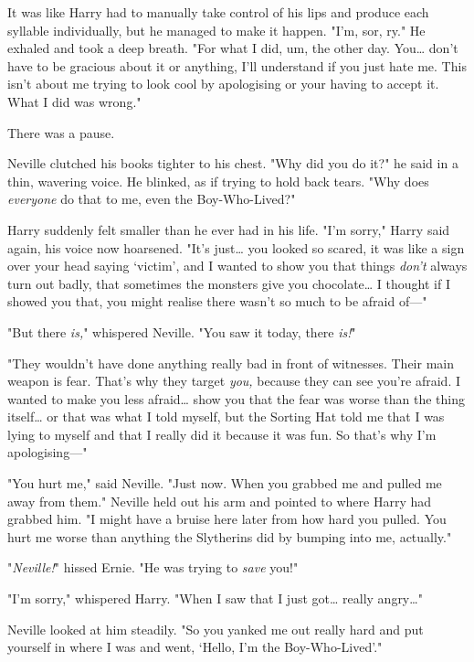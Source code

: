 It was like Harry had to manually take control of his lips and produce each
syllable individually, but he managed to make it happen. "I'm, sor, ry." He
exhaled and took a deep breath. "For what I did, um, the other day. You{\ldots}
don't have to be gracious about it or anything, I'll understand if you just
hate me. This isn't about me trying to look cool by apologising or your having
to accept it. What I did was wrong."

There was a pause.

Neville clutched his books tighter to his chest. "Why did you do it?" he said
in a thin, wavering voice. He blinked, as if trying to hold back tears. "Why
does \emph{everyone} do that to me, even the Boy-Who-Lived?"

Harry suddenly felt smaller than he ever had in his life. "I'm sorry," Harry
said again, his voice now hoarsened. "It's just{\ldots} you looked so scared,
it was like a sign over your head saying `victim', and I wanted to show you
that things \emph{don't} always turn out badly, that sometimes the monsters
give you chocolate{\ldots} I thought if I showed you that, you might realise
there wasn't so much to be afraid of---"

"But there \emph{is,}" whispered Neville. "You saw it today, there \emph{is!}"

"They wouldn't have done anything really bad in front of witnesses. Their main
weapon is fear. That's why they target \emph{you,} because they can see you're
afraid. I wanted to make you less afraid{\ldots} show you that the fear was
worse than the thing itself{\ldots} or that was what I told myself, but the
Sorting Hat told me that I was lying to myself and that I really did it because
it was fun. So that's why I'm apologising---"

"You hurt me," said Neville. "Just now. When you grabbed me and pulled me away
from them." Neville held out his arm and pointed to where Harry had grabbed
him. "I might have a bruise here later from how hard you pulled. You hurt me
worse than anything the Slytherins did by bumping into me, actually."

"\emph{Neville!}" hissed Ernie. "He was trying to \emph{save} you!"

"I'm sorry," whispered Harry. "When I saw that I just got{\ldots} really
angry{\ldots}"

Neville looked at him steadily. "So you yanked me out really hard and put
yourself in where I was and went, `Hello, I'm the Boy-Who-Lived'."

